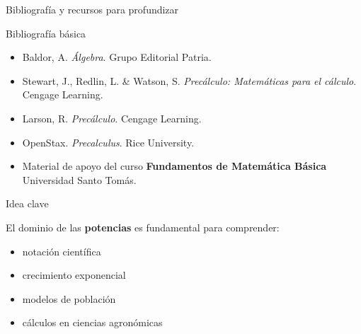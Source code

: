 \documentclass[aspectratio=169,10pt,handout]{beamer}
\newenvironment{ideaBox}
{\begin{exampleblock}{Idea clave}}
	{\end{exampleblock}}
\begin{document}
	\begin{frame}{Bibliografía y recursos para profundizar}
		
		\begin{block}{Bibliografía básica}
			
			\begin{itemize}
				
				\item Baldor, A. \textit{Álgebra}. Grupo Editorial Patria.
				
				\item Stewart, J., Redlin, L. \& Watson, S.  
				\textit{Precálculo: Matemáticas para el cálculo}. Cengage Learning.
				
				\item Larson, R. \textit{Precálculo}. Cengage Learning.
				
				\item OpenStax. \textit{Precalculus}. Rice University.
				
				\item Material de apoyo del curso  
				\textbf{Fundamentos de Matemática Básica}  
				Universidad Santo Tomás.
				
			\end{itemize}
			
		\end{block}
		
		\pause
		
		\begin{ideaBox}
			
			El dominio de las \textbf{potencias} es fundamental para comprender:
			
			\begin{itemize}
				
				\item notación científica
				
				\item crecimiento exponencial
				
				\item modelos de población
				
				\item cálculos en ciencias agronómicas
				
			\end{itemize}
			
		\end{ideaBox}
		
	\end{frame}
	
\end{document}
